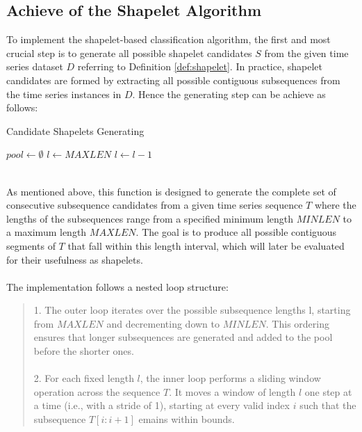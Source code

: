 \subsection{Achieve of the Shapelet Algorithm}\label{sec:algo}

To implement the shapelet-based classification algorithm, the first and most crucial step is to generate all possible shapelet candidates $S$ from the given time series dataset $D$ referring to Definition \ref{def:shapelet}. In practice, shapelet candidates are formed by extracting all possible contiguous subsequences from the time series instances in $D$. Hence the generating step can be achieve as follows:\\
\begin{algorithm}[h!]
	\caption{Candidate Shapelets Generating}
	\begin{algorithmic}[1]{
		\State $pool \gets \emptyset$
		\State $l \gets MAXLEN$
		\State $l \gets l - 1$
		\EndWhile
		\EndProcedure
	}
	\end{algorithmic}
	\label{al:CandidateGenerate}
\end{algorithm}
\\
As mentioned above, this function is designed to generate the complete set of consecutive subsequence candidates from a given time series sequence $T$ where the lengths of the subsequences range from a specified minimum length $MINLEN$ to a maximum length $MAXLEN$. The goal is to produce all possible contiguous segments of $T$ that fall within this length interval, which will later be evaluated for their usefulness as shapelets.\\
\\
The implementation follows a nested loop structure:
\begin{quote}
1. The outer loop iterates over the possible subsequence lengths l, starting from $MAXLEN$ and decrementing down to $MINLEN$. This ordering ensures that longer subsequences are generated and added to the pool before the shorter ones.\\
\\
2. For each fixed length $l$, the inner loop performs a sliding window operation across the sequence $T$. It moves a window of length 
$l$ one step at a time (i.e., with a stride of 1), starting at every valid index $i$ such that the subsequence $T[i:i+1]$ emains within bounds.
\end{quote}
